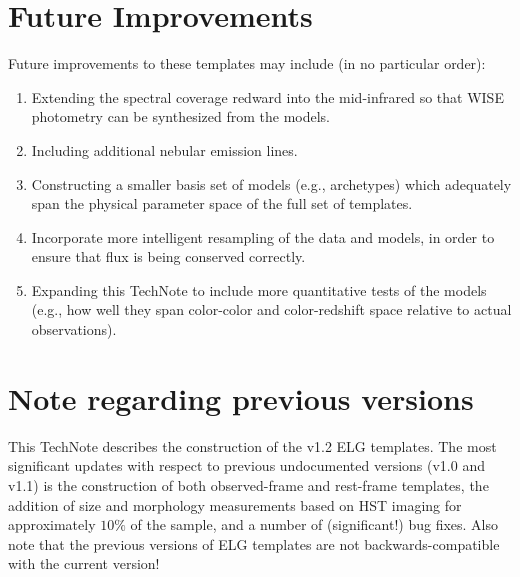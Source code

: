 \documentclass[12pt]{article}
\begin{document}
\section{Future Improvements}

Future improvements to these templates may include (in no particular
order): 

\begin{enumerate}
\item{Extending the spectral coverage redward into the mid-infrared so
  that WISE photometry can be synthesized from the models.}
\item{Including additional nebular emission lines.}
\item{Constructing a smaller basis set of models (e.g., archetypes)
  which adequately span the physical parameter space of the full set
  of templates.}
\item{Incorporate more intelligent resampling of the data and models,
  in order to ensure that flux is being conserved correctly.}
\item{Expanding this TechNote to include more quantitative tests of
  the models (e.g., how well they span color-color and color-redshift
  space relative to actual observations).}
\end{enumerate}

\section{Note regarding previous versions}

This TechNote describes the construction of the v1.2 ELG templates.
The most significant updates with respect to previous undocumented
versions (v1.0 and v1.1) is the construction of both observed-frame
and rest-frame templates, the addition of size and morphology
measurements based on HST imaging for approximately $10\%$ of the
sample, and a number of (significant!) bug fixes.  Also note that the
previous versions of ELG templates are not backwards-compatible with
the current version!




%
\end{document}

